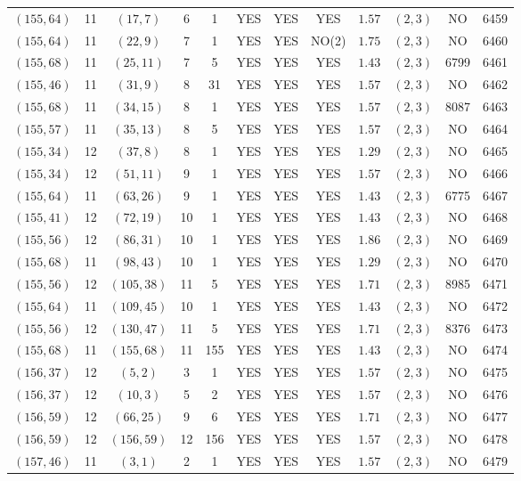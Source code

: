 \begin{longtable}{|c|c|c|c|c|c|c|c|c|c|c|c|}
$(155,64)$ & 11 & $(17,7)$ & 6 & 1 & YES & YES & YES & $1.57$ & $(2,3)$ & NO & 6459\\
$(155,64)$ & 11 & $(22,9)$ & 7 & 1 & YES & YES & NO(2) & $1.75$ & $(2,3)$ & NO & 6460\\
$(155,68)$ & 11 & $(25,11)$ & 7 & 5 & YES & YES & YES & $1.43$ & $(2,3)$ & 6799 & 6461\\
$(155,46)$ & 11 & $(31,9)$ & 8 & 31 & YES & YES & YES & $1.57$ & $(2,3)$ & NO & 6462\\
$(155,68)$ & 11 & $(34,15)$ & 8 & 1 & YES & YES & YES & $1.57$ & $(2,3)$ & 8087 & 6463\\
$(155,57)$ & 11 & $(35,13)$ & 8 & 5 & YES & YES & YES & $1.57$ & $(2,3)$ & NO & 6464\\
$(155,34)$ & 12 & $(37,8)$ & 8 & 1 & YES & YES & YES & $1.29$ & $(2,3)$ & NO & 6465\\
$(155,34)$ & 12 & $(51,11)$ & 9 & 1 & YES & YES & YES & $1.57$ & $(2,3)$ & NO & 6466\\
$(155,64)$ & 11 & $(63,26)$ & 9 & 1 & YES & YES & YES & $1.43$ & $(2,3)$ & 6775 & 6467\\
$(155,41)$ & 12 & $(72,19)$ & 10 & 1 & YES & YES & YES & $1.43$ & $(2,3)$ & NO & 6468\\
$(155,56)$ & 12 & $(86,31)$ & 10 & 1 & YES & YES & YES & $1.86$ & $(2,3)$ & NO & 6469\\
$(155,68)$ & 11 & $(98,43)$ & 10 & 1 & YES & YES & YES & $1.29$ & $(2,3)$ & NO & 6470\\
$(155,56)$ & 12 & $(105,38)$ & 11 & 5 & YES & YES & YES & $1.71$ & $(2,3)$ & 8985 & 6471\\
$(155,64)$ & 11 & $(109,45)$ & 10 & 1 & YES & YES & YES & $1.43$ & $(2,3)$ & NO & 6472\\
$(155,56)$ & 12 & $(130,47)$ & 11 & 5 & YES & YES & YES & $1.71$ & $(2,3)$ & 8376 & 6473\\
$(155,68)$ & 11 & $(155,68)$ & 11 & 155 & YES & YES & YES & $1.43$ & $(2,3)$ & NO & 6474\\
$(156,37)$ & 12 & $(5,2)$ & 3 & 1 & YES & YES & YES & $1.57$ & $(2,3)$ & NO & 6475\\
$(156,37)$ & 12 & $(10,3)$ & 5 & 2 & YES & YES & YES & $1.57$ & $(2,3)$ & NO & 6476\\
$(156,59)$ & 12 & $(66,25)$ & 9 & 6 & YES & YES & YES & $1.71$ & $(2,3)$ & NO & 6477\\
$(156,59)$ & 12 & $(156,59)$ & 12 & 156 & YES & YES & YES & $1.57$ & $(2,3)$ & NO & 6478\\
$(157,46)$ & 11 & $(3,1)$ & 2 & 1 & YES & YES & YES & $1.57$ & $(2,3)$ & NO & 6479\\

\end{longtable}
